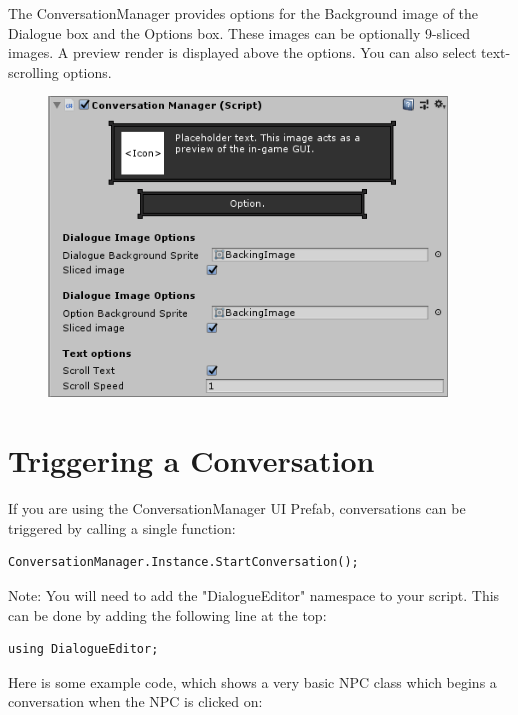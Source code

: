 \documentclass[a4paper,12pt]{article}
\begin{document}
The ConversationManager provides options for the Background image of the Dialogue box and the Options box. These images can be optionally 9-sliced images. A preview render is displayed above the options. You can also select text-scrolling options.

\begin{figure}[h]
\centering
\includegraphics[width=300pt, keepaspectratio]{img/ConversationManager.png}
\end{figure}

\newpage





\section{Triggering a Conversation}
\hypertarget{_triggering}{}

If you are using the ConversationManager UI Prefab, conversations can be triggered by calling a single function:
\bigskip

\begin{lstlisting}
ConversationManager.Instance.StartConversation();
\end{lstlisting}
\bigskip

Note: You will need to add the "DialogueEditor" namespace to your script. This can be done by adding the following line at the top:
\bigskip

\begin{lstlisting}
using DialogueEditor;
\end{lstlisting}
\bigskip

Here is some example code, which shows a very basic NPC class which begins a conversation when the NPC is clicked on:
\bigskip
\end{document}

